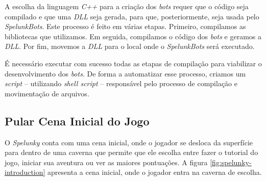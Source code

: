 A escolha da linguagem \textit{C++} para a criação dos \textit{bots} requer que
o código seja compilado e que uma \textit{DLL} seja gerada, para que,
posteriormente, seja usada pelo \textit{SpelunkBots}. Este processo é feito em
várias etapas.  Primeiro, compilamos as bibliotecas que utilizamos. Em seguida,
compilamos o código dos \textit{bots} e geramos a \textit{DLL}. Por fim,
movemos a \textit{DLL} para o local onde o \textit{SpelunkBots} será executado.

É necessário executar com sucesso todas as etapas de compilação para viabilizar
o desenvolvimento dos \textit{bots}. De forma a automatizar esse processo,
criamos um \textit{script} -- utilizando \textit{shell script} -- responsável
pelo processo de compilação e movimentação de arquivos.

\subsection{Pular Cena Inicial do Jogo}

O \textit{Spelunky} conta com uma cena inicial, onde o jogador se desloca da
superfície para dentro de uma caverna que permite que ele escolha entre fazer o
tutorial do jogo, iniciar sua aventura ou ver as maiores pontuações. A figura
\ref{fig:spelunky-introduction} apresenta a cena inicial, onde o jogador entra
na caverna de escolha.

